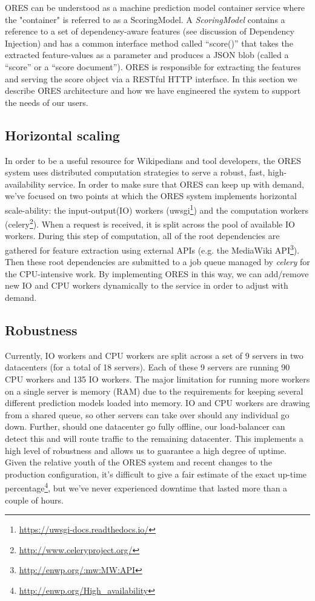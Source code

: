 
ORES can be understood as a machine prediction model container service where the "container" is referred to as a ScoringModel.  A \emph{ScoringModel} contains a reference to a set of dependency-aware features (see discussion of Dependency Injection) and has a common interface method called ``score()'' that takes the extracted feature-values as a parameter and produces a JSON blob (called a ``score'' or a ``score document'').  ORES is responsible for extracting the features and serving the score object via a RESTful HTTP interface.  In this section we describe ORES architecture and how we have engineered the system to support the needs of our users.

\subsection{Horizontal scaling}
In order to be a useful resource for Wikipedians and tool developers, the ORES system uses distributed computation strategies to serve a robust, fast, high-availability service.   In order to make sure that ORES can keep up with demand, we've focused on  two points at which the ORES system implements horizontal scale-ability: the input-output(IO) workers (uwsgi\footnote{\url{https://uwsgi-docs.readthedocs.io/}}) and the computation workers (celery\footnote{\url{http://www.celeryproject.org/}}).  When a request is received, it is split across the pool of available IO workers.  During this step of computation, all of the root dependencies are gathered for feature extraction using external APIs (e.g. the MediaWiki API\footnote{\url{http://enwp.org/:mw:MW:API}}).  Then these root dependencies are submitted to a job queue managed by \emph{celery} for the CPU-intensive work.  By implementing ORES in this way, we can add/remove new IO and CPU workers dynamically to the service in order to adjust with demand.

\subsection{Robustness}
Currently, IO workers and CPU workers are split across a set of 9 servers in two datacenters (for a total of 18 servers).  Each of these 9 servers are running 90 CPU workers and 135 IO workers.  The major limitation for running more workers on a single server is memory (RAM) due to the requirements for keeping several different prediction models loaded into memory.  IO and CPU workers are drawing from a shared queue, so other servers can take over should any individual go down.  Further, should one datacenter go fully offline, our load-balancer can detect this and will route traffic to the remaining datacenter.  This implements a high level of robustness and allows us to guarantee a high degree of uptime.  Given the relative youth of the ORES system and recent changes to the production configuration, it's difficult to give a fair estimate of the exact up-time percentage\footnote{\url{http://enwp.org/High_availability}}, but we've never experienced downtime that lasted more than a couple of hours.


